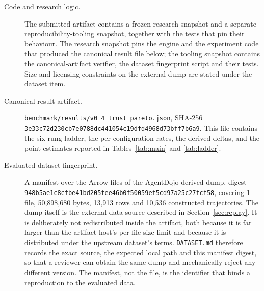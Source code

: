 \documentclass[letterpaper,twocolumn,10pt]{article}
\newcommand{\hb}{\allowbreak}
\begin{document}
\begin{description}


\item[Code and research logic.] The submitted artifact contains a frozen
research snapshot and a separate reproducibility-tooling snapshot, together
with the tests that pin their behaviour. The research snapshot pins the engine
and the experiment code that produced the canonical result file below; the
tooling snapshot contains the canonical-artifact verifier, the dataset
fingerprint script and their tests. Size and licensing constraints on the
external dump are stated under the dataset item.

\item[Canonical result artifact.]
\texttt{benchmark/results/v0\_4\_trust\_pareto.json}, SHA-256
\texttt{3e33\hb c72d\hb 230c\hb b7e0\hb 788d\hb c441\hb 2574\hb 054c\hb 19df\hb d496\hb 5465\hb 7369\hb 8d73\hb bff7\hb b6a9\hb 0565}.
This
file contains the six-rung ladder, the per-configuration rates, the derived
deltas, and the point estimates reported in Tables~\ref{tab:main} and
\ref{tab:ladder}.

\item[Evaluated dataset fingerprint.] A manifest over the Arrow files of the
AgentDojo-derived dump, digest
\texttt{948b\hb 9432\hb 5ae1\hb c8cf\hb be41\hb bd20\hb 5fee\hb 46b0\hb f500\hb 2155\hb 59ef\hb 5cd9\hb 7a25\hb c27f\hb cf58\hb 0049},
covering 1 file, 50,898,680 bytes, 13,913 rows and 10,536 constructed
trajectories. The dump itself is the external data source described in
Section~\ref{sec:replay}. It is deliberately not redistributed inside the
artifact, both because it is far larger than the artifact host's per-file size
limit and because it is distributed under the upstream dataset's terms.
\texttt{DATASET.md} therefore records the exact source, the expected local
path and this manifest digest, so that a reviewer can obtain the same dump and
mechanically reject any different version. The manifest, not the file, is the
identifier that binds a reproduction to the evaluated data.


\end{description}
\end{document}
